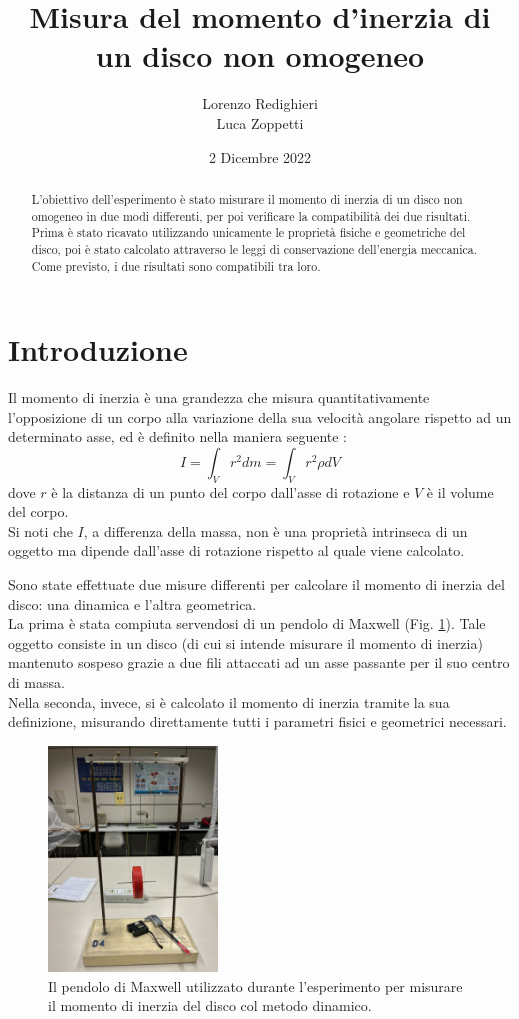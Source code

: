 \documentclass{article}
\title{Misura del momento d’inerzia di un disco non omogeneo}
\author{Lorenzo Redighieri\\Luca Zoppetti}
\date{2 Dicembre 2022}
\begin{document}
\maketitle

\begin{abstract}
L'obiettivo dell'esperimento è stato misurare il momento di inerzia di un disco non omogeneo in due modi differenti, per poi verificare la compatibilità dei due risultati. Prima è stato ricavato utilizzando unicamente le proprietà fisiche e geometriche del disco, poi è stato calcolato attraverso le leggi di conservazione dell'energia meccanica. Come previsto, i due risultati sono compatibili tra loro.
\end{abstract}

\newpage

\section{Introduzione}
Il momento di inerzia è una grandezza che misura quantitativamente l'opposizione di un corpo alla variazione della sua velocità angolare rispetto ad un determinato asse, ed è definito nella maniera seguente \cite{focardi:inerzia}:
$$ I = \int_V r ^ 2 dm = \int_V r ^ 2 \rho dV $$
dove $ r $ è la distanza di un punto del corpo dall'asse di rotazione e $ V $ è il volume del corpo. \\
Si noti che $ I $, a differenza della massa, non è una proprietà intrinseca di un oggetto ma dipende dall'asse di rotazione rispetto al quale viene calcolato.
\par Sono state effettuate due misure differenti per calcolare il momento di inerzia del disco: una dinamica e l'altra geometrica.\\
La prima è stata compiuta servendosi di un pendolo di Maxwell (Fig. \ref{maxwell}). Tale oggetto consiste in un disco (di cui si intende misurare il momento di inerzia) mantenuto sospeso grazie a due fili attaccati ad un asse passante per il suo centro di massa.\\
Nella seconda, invece, si è calcolato il momento di inerzia tramite la sua definizione, misurando direttamente tutti i parametri fisici e geometrici necessari.

\begin{figure}[h!]
\centering
\includegraphics[width=0.4\textwidth]{maxwell}
\caption{Il pendolo di Maxwell utilizzato durante l'esperimento per misurare il momento di inerzia del disco col metodo dinamico.}
\label{maxwell}
\end{figure}
\end{document}
